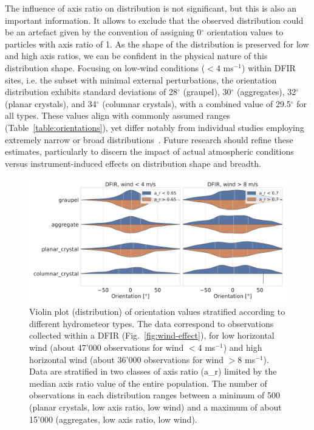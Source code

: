 \documentclass[draft]{agujournal2019}
\begin{document}
The influence of axis ratio on distribution is not significant, but this is also an important information. It allows to exclude that the observed distribution could be an artefact given by the convention of assigning 0$^\circ$ orientation values to particles with axis ratio of 1. As the shape of the distribution is preserved for low and high axis ratios, we can be confident in the physical nature of this distribution shape. 
 Focusing on low-wind conditions ($<4$ ms$^{-1}$) within DFIR sites, i.e. the subset with minimal external perturbations, the orientation distribution exhibits standard deviations of 28$^\circ$ (graupel), 30$^\circ$ (aggregates), 32$^\circ$ (planar crystals), and 34$^\circ$ (columnar crystals), with a combined value of 29.5$^\circ$ for all types. These values align with commonly assumed ranges (Table~\ref{table:orientations}), yet differ notably from individual studies employing extremely narrow or broad distributions~\cite{Matrosov_JAM_2001, Matrosov_JAS_2005, Ryzhkov_JAMC_2011, Bukovic_JAMC_2018}. Future research should refine these estimates, particularly to discern the impact of actual atmospheric conditions versus instrument-induced effects on distribution shape and breadth.

 
\begin{figure}
 \noindent \centering \includegraphics[width=\textwidth]{Fig05.png}
\caption{Violin plot (distribution) of orientation values stratified according to different hydrometeor types. The data correspond to observations collected within a DFIR (Fig.~\ref{fig:wind-effect}), for low horizontal wind (about 47'000 observations for wind $<4$ ms$^{-1}$) and high horizontal wind (about 36'000 observations for wind $>8$ ms$^{-1}$). Data are stratified in two classes of axis ratio (a\_r) limited by the median axis ratio value of the entire population. The number of observations in each distribution ranges between a minimum of 500 (planar crystals, low axis ratio, low wind) and a maximum of about 15'000 (aggregates, low axis ratio, low wind).} 
\label{fig:hydroclass}
\end{figure}
\end{document}
